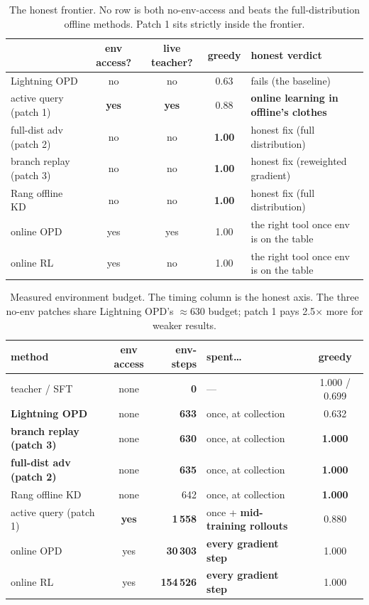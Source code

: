 \documentclass[11pt]{article}
\begin{document}
\begin{table}[h]
\centering
\small
\begin{tabular}{l c c c l}
\toprule
 & \textbf{env access?} & \textbf{live teacher?} & \textbf{greedy} & \textbf{honest verdict} \\
\midrule
Lightning OPD            & no  & no  & 0.63 & fails (the baseline) \\
active query (patch 1)   & \textbf{yes} & \textbf{yes} & 0.88 & \textbf{online learning in offline's clothes} \\
full-dist adv (patch 2)  & no  & no  & \textbf{1.00} & honest fix (full distribution) \\
branch replay (patch 3)  & no  & no  & \textbf{1.00} & honest fix (reweighted gradient) \\
Rang offline KD          & no  & no  & \textbf{1.00} & honest fix (full distribution) \\
online OPD               & yes & yes & 1.00 & the right tool once env is on the table \\
online RL                & yes & no  & 1.00 & the right tool once env is on the table \\
\bottomrule
\end{tabular}
\caption{The honest frontier. No row is both no-env-access and beats the
full-distribution offline methods. Patch 1 sits strictly inside the frontier.}
\label{tab:frontier}
\end{table}

\begin{table}[h]
\centering
\small
\begin{tabular}{l c r l c}
\toprule
\textbf{method} & \textbf{env access} & \textbf{env-steps} & \textbf{spent\ldots} & \textbf{greedy} \\
\midrule
teacher / SFT             & none & \textbf{0}     & ---                            & 1.000 / 0.699 \\
\textbf{Lightning OPD}    & none & \textbf{633}   & once, at collection            & 0.632 \\
\textbf{branch replay (patch 3)} & none & \textbf{630} & once, at collection       & \textbf{1.000} \\
\textbf{full-dist adv (patch 2)} & none & \textbf{635} & once, at collection       & \textbf{1.000} \\
Rang offline KD           & none & 642            & once, at collection            & \textbf{1.000} \\
active query (patch 1)    & \textbf{yes} & \textbf{1\,558} & once + \textbf{mid-training rollouts} & 0.880 \\
online OPD                & yes  & \textbf{30\,303}  & \textbf{every gradient step} & 1.000 \\
online RL                 & yes  & \textbf{154\,526} & \textbf{every gradient step} & 1.000 \\
\bottomrule
\end{tabular}
\caption{Measured environment budget. The timing column is the honest axis.
The three no-env patches share Lightning OPD's $\approx$630 budget; patch 1 pays
2.5$\times$ more for weaker results.}
\label{tab:budget}
\end{table}
\end{document}
